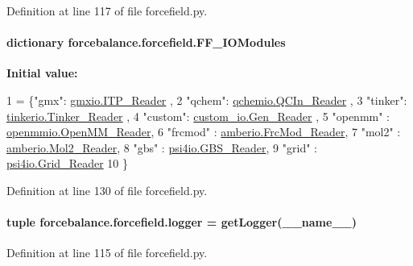 Definition at line 117 of file forcefield.\-py.

\hypertarget{namespaceforcebalance_1_1forcefield_a3beac9806e0438b79b9ae60a47c7b131}{
\paragraph[{F\-F\-\_\-\-I\-O\-Modules}]{\setlength{\rightskip}{0pt plus 5cm}dictionary forcebalance.\-forcefield.\-F\-F\-\_\-\-I\-O\-Modules}}\label{namespaceforcebalance_1_1forcefield_a3beac9806e0438b79b9ae60a47c7b131}
{\bfseries Initial value\-:}
\begin{DoxyCode}
1 = \{\textcolor{stringliteral}{"gmx"}: \hyperlink{classforcebalance_1_1gmxio_1_1ITP__Reader}{gmxio.ITP\_Reader} ,
2                 \textcolor{stringliteral}{"qchem"}: \hyperlink{classforcebalance_1_1qchemio_1_1QCIn__Reader}{qchemio.QCIn\_Reader} ,
3                 \textcolor{stringliteral}{"tinker"}: \hyperlink{classforcebalance_1_1tinkerio_1_1Tinker__Reader}{tinkerio.Tinker\_Reader} ,
4                 \textcolor{stringliteral}{"custom"}: \hyperlink{classforcebalance_1_1custom__io_1_1Gen__Reader}{custom\_io.Gen\_Reader} , 
5                 \textcolor{stringliteral}{"openmm"} : \hyperlink{classforcebalance_1_1openmmio_1_1OpenMM__Reader}{openmmio.OpenMM\_Reader},
6                 \textcolor{stringliteral}{"frcmod"} : \hyperlink{classforcebalance_1_1amberio_1_1FrcMod__Reader}{amberio.FrcMod\_Reader},
7                 \textcolor{stringliteral}{"mol2"} : \hyperlink{classforcebalance_1_1amberio_1_1Mol2__Reader}{amberio.Mol2\_Reader},
8                 \textcolor{stringliteral}{"gbs"} : \hyperlink{classforcebalance_1_1psi4io_1_1GBS__Reader}{psi4io.GBS\_Reader},
9                 \textcolor{stringliteral}{"grid"} : \hyperlink{classforcebalance_1_1psi4io_1_1Grid__Reader}{psi4io.Grid\_Reader}
10                 \}
\end{DoxyCode}


Definition at line 130 of file forcefield.\-py.

\hypertarget{namespaceforcebalance_1_1forcefield_ab770be419e9b4522779dc3dfb1d7d019}{
\paragraph[{logger}]{\setlength{\rightskip}{0pt plus 5cm}tuple forcebalance.\-forcefield.\-logger = get\-Logger(\-\_\-\-\_\-name\-\_\-\-\_\-)}}\label{namespaceforcebalance_1_1forcefield_ab770be419e9b4522779dc3dfb1d7d019}


Definition at line 115 of file forcefield.\-py.

